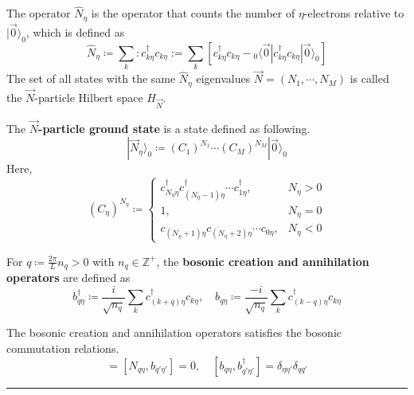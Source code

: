 \begin{defn}
The operator $\hat{N}_\eta$ is the operator that counts the number of $\eta$-electrons relative to $|\vec{0}\rangle_0$, which is defined as
\begin{equation}
\hat{N}_\eta\coloneqq \sum_k :c_{k\eta}^\dagger c_{k\eta}:=\sum_k \left[c_{k\eta}^\dagger c_{k\eta}-{}_0\langle \vec{0}|c_{k\eta}^\dagger c_{k\eta}|\vec{0}\rangle_0\right]
\end{equation}
The set of all states with the same $\hat{N}_\eta$ eigenvalues $\vec{N}=(N_1,\cdots,N_M)$ is called the $\vec{N}$-particle Hilbert space $H_{\vec{N}}$.

The \textbf{$\vec{N}$-particle ground state} is a state defined as following.
\begin{equation}
|\vec{N}_\eta\rangle_0\coloneqq (C_1)^{N_1}\cdots(C_M)^{N_M}|\vec{0}\rangle_0
\end{equation}
Here,
\begin{equation}
(C_\eta)^{N_\eta}\coloneqq\begin{cases}
c_{N_\eta \eta}^\dagger c_{(N_\eta-1)\eta}^\dagger \cdots c_{1\eta}^\dagger,& N_\eta>0\\
1,&N_\eta=0\\
c_{(N_\eta+1)\eta}c_{(N_\eta+2)\eta}\cdots c_{0\eta},&N_\eta<0
\end{cases}
\end{equation}
\end{defn}

\begin{defn} For $q\coloneqq \frac{2\pi}{L}n_q>0$ with $n_q\in \mathbb{Z}^+$, the \textbf{bosonic creation and annihilation operators} are defined as
\begin{equation}
b_{q\eta}^\dagger \coloneqq \frac{i}{\sqrt{n_q}}\sum_k c_{(k+q)\eta}^\dagger c_{k\eta},\quad b_{q\eta}\coloneqq \frac{-i}{\sqrt{n_q}}\sum_k c_{(k-q)\eta}^\dagger c_{k\eta}
\end{equation}
\end{defn}

\begin{prop} The bosonic creation and annihilation operators satisfies the bosonic commutation relations.
\begin{equation}
[b_{q\eta},b_{q'\eta'}]=[N_{q\eta},b_{q'\eta'}]=0,\quad [b_{q\eta},b_{q'\eta'}^\dagger]=\delta_{\eta\eta'}\delta_{qq'}
\end{equation}
\end{prop}

\noindent\rule{\textwidth}{1pt}
\newline